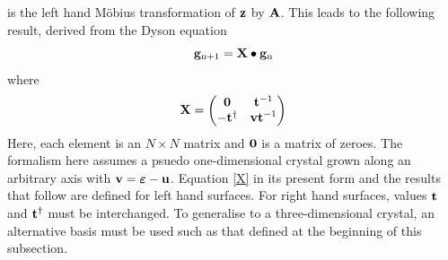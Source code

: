 \documentclass[a4paper, 12pt]{article}
\begin{document}
is the left hand M\"{o}bius transformation of $\bf z$ by $\bf A$.
This leads to the following result, derived from the Dyson equation
\begin{equation}
	{\bf g}_{{\rm n}+1} = {\bf X}\bullet {\bf g}_{\rm n}
\end{equation}
where
\begin{equation}\label{X}
	\bf{X} = \begin{pmatrix} \bf0&\bf{t}^{\rm{-1}}\\-\bf{t}^{\rm{\dag}}&\bf{vt}^{\rm{-1}} \end{pmatrix}
\end{equation}
Here, each element is an $N \times N$ matrix and $\bf{0}$ is a matrix of zeroes. The formalism here assumes a psuedo one-dimensional crystal grown along an arbitrary axis with ${\bf v} = \bm\varepsilon - {\bf u}$. Equation \eqref{X} in its present form and the results that follow are defined for left hand surfaces. For right hand surfaces, values $\bf{t}$ and $\bf{t}^{\rm{\dag}}$ must be interchanged.
To generalise to a three-dimensional crystal, an alternative basis must be used such as that defined at the beginning of this subsection.

\end{document}
